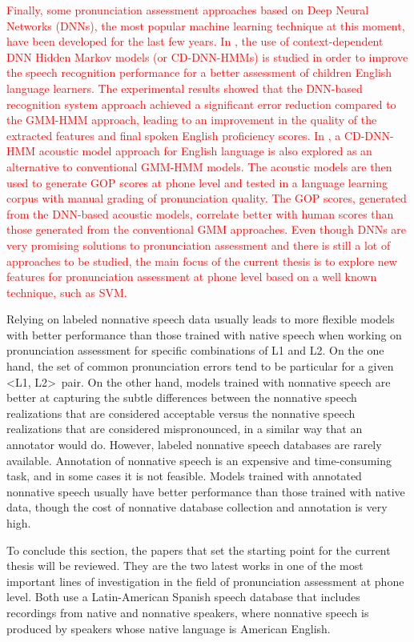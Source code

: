 \textcolor{red}{
  Finally, some pronunciation assessment approaches based on Deep Neural Networks (DNNs),
  the most popular machine learning technique at this moment, have been developed for the
  last few years. In \cite{metallinou_2014}, the use of context-dependent DNN Hidden
  Markov models (or CD-DNN-HMMs) is studied in order to improve the speech recognition
  performance for a better assessment of children English language learners.
  The experimental results showed that the DNN-based recognition system approach
  achieved a significant error reduction compared to the GMM-HMM approach, leading
  to an improvement in the quality of the extracted features and final spoken English
  proficiency scores.
  In \cite{hu_1, hu_2}, a CD-DNN-HMM acoustic model approach for English language
  is also explored as an alternative to
  conventional GMM-HMM models.
  The acoustic models are then used to generate GOP scores
  at phone level and tested in a language learning corpus with manual grading
  of pronunciation quality. The GOP scores, generated from the DNN-based acoustic
  models, correlate better with human scores than those generated from the
  conventional GMM approaches.
  Even though DNNs are very promising
  solutions to pronunciation assessment and there is still a lot
  of approaches to be studied, the main focus of the current thesis is to explore
  new features for pronunciation assessment at phone level based
  on a well known technique, such as SVM.
}

Relying on labeled nonnative speech data usually leads to more flexible models
with better performance than those trained with native speech
when working on pronunciation assessment for specific combinations of L1 and L2. On the one hand,
the set of common pronunciation errors tend to be particular for a given \textless L1, L2\textgreater \ pair. On the other hand, models trained
with nonnative speech are better at capturing the subtle differences between the nonnative
speech realizations that are considered acceptable versus the nonnative speech realizations
that are considered mispronounced, in a similar way that an annotator would do.
However, labeled nonnative speech databases are rarely available. Annotation
of nonnative speech is an expensive and time-consuming task, and in some cases it is not feasible.
Models trained with annotated nonnative speech usually have better performance
than those trained with native data, though the cost of nonnative database
collection and annotation is very high.

To conclude this section, the papers that set the starting point for the current thesis will
be reviewed. They are the two latest works in one of the most important lines of investigation
in the field of pronunciation assessment at phone level.
Both use a Latin-American Spanish speech database that includes recordings from
native and nonnative speakers, where nonnative speech
is produced by speakers whose native language is American English.

